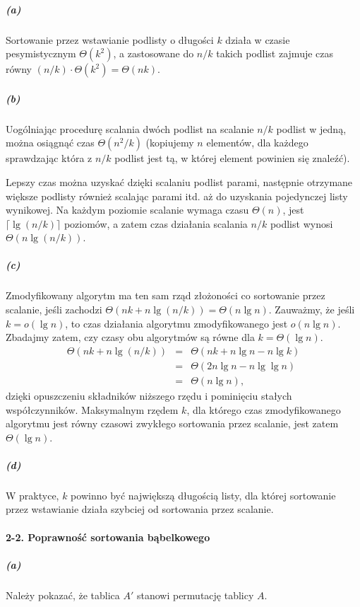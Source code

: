 \subparagraph{(a)}
Sortowanie przez wstawianie podlisty o długości $k$ działa w czasie pesymistycznym $\Theta(k^2)$, a zastosowane do $n/k$ takich podlist zajmuje czas równy $(n/k)\cdot\Theta(k^2) = \Theta(nk)$.

\subparagraph{(b)}
Uogólniając procedurę scalania dwóch podlist na scalanie $n/k$ podlist w jedną, można osiągnąć czas $\Theta(n^2/k)$ (kopiujemy $n$ elementów, dla każdego sprawdzając która z $n/k$ podlist jest tą, w której element powinien się znaleźć).

Lepszy czas można uzyskać dzięki scalaniu podlist parami, następnie otrzymane większe podlisty również scalając parami itd. aż do uzyskania pojedynczej listy wynikowej. Na każdym poziomie scalanie wymaga czasu $\Theta(n)$, jest $\lceil\lg(n/k)\rceil$ poziomów, a zatem czas działania scalania $n/k$ podlist wynosi\linebreak$\Theta(n\lg(n/k))$.

\subparagraph{(c)}
Zmodyfikowany algorytm ma ten sam rząd złożoności co sortowanie przez scalanie, jeśli zachodzi $\Theta(nk+n\lg(n/k))=\Theta(n\lg n)$. Zauważmy, że jeśli $k=o(\lg n)$, to czas działania algorytmu zmodyfikowanego jest $o(n\lg n)$. Zbadajmy zatem, czy czasy obu algorytmów są równe dla $k=\Theta(\lg n)$.
\begin{eqnarray*}
	\Theta(nk+n\lg(n/k)) &=& \Theta(nk+n\lg n-n\lg k) \\
	&=& \Theta(2n\lg n-n\lg\lg n) \\
	&=& \Theta(n\lg n),
\end{eqnarray*}
dzięki opuszczeniu składników niższego rzędu i pominięciu stałych współczynników. Maksymalnym rzędem $k$, dla którego czas zmodyfikowanego algorytmu jest równy czasowi zwykłego sortowania przez scalanie, jest zatem $\Theta(\lg n)$.

\subparagraph{(d)}
W praktyce, $k$ powinno być największą długością listy, dla której sortowanie przez wstawianie działa szybciej od sortowania przez scalanie.

\paragraph{2-2. Poprawność sortowania bąbelkowego}

\subparagraph{(a)}
Należy pokazać, że tablica $A'$ stanowi permutację tablicy $A$.

